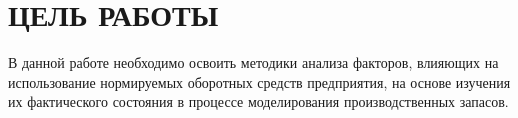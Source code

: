 \section{ЦЕЛЬ РАБОТЫ}

В данной работе необходимо освоить методики анализа факторов,
влияющих на использование нормируемых оборотных средств предприятия, 
на основе изучения их фактического состояния в процессе моделирования 
производственных запасов.

\newpage
